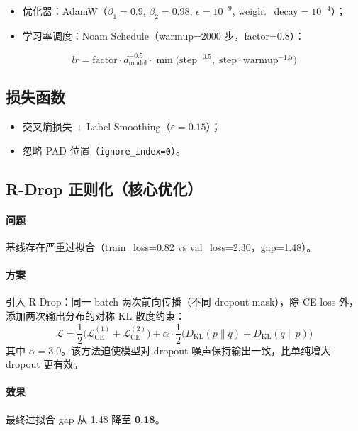 \documentclass[12pt, a4paper]{ctexart}
\begin{document}
\begin{itemize}[nosep]
  \item 优化器：AdamW（$\beta_1=0.9$, $\beta_2=0.98$, $\epsilon=10^{-9}$, weight\_decay$=10^{-4}$）；
  \item 学习率调度：Noam Schedule（warmup=2000 步，factor=0.8）：
\end{itemize}
\begin{equation}
  lr = \text{factor} \cdot d_{\text{model}}^{-0.5} \cdot \min\!\bigl(\text{step}^{-0.5},\; \text{step} \cdot \text{warmup}^{-1.5}\bigr)
\end{equation}

\subsection{损失函数}

\begin{itemize}[nosep]
  \item 交叉熵损失 + Label Smoothing（$\varepsilon = 0.15$）；
  \item 忽略 PAD 位置（\texttt{ignore\_index=0}）。
\end{itemize}

\subsection{R-Drop 正则化（核心优化）}

\paragraph{问题} 基线存在严重过拟合（train\_loss=0.82 vs val\_loss=2.30，gap=1.48）。

\paragraph{方案} 引入 R-Drop\cite{liang2021}：同一 batch 两次前向传播（不同 dropout mask），除 CE loss 外，添加两次输出分布的对称 KL 散度约束：
\begin{equation}
  \mathcal{L} = \frac{1}{2}\bigl(\mathcal{L}_{\text{CE}}^{(1)} + \mathcal{L}_{\text{CE}}^{(2)}\bigr) + \alpha \cdot \frac{1}{2}\bigl(D_{\text{KL}}(p \| q) + D_{\text{KL}}(q \| p)\bigr)
\end{equation}
其中 $\alpha=3.0$。该方法迫使模型对 dropout 噪声保持输出一致，比单纯增大 dropout 更有效。

\paragraph{效果} 最终过拟合 gap 从 1.48 降至 \textbf{0.18}。
\end{document}
